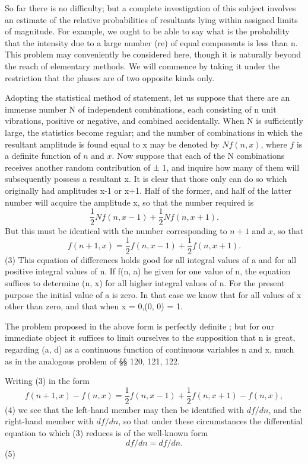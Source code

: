 So far there is no difficulty; but a complete investigation of this
subject involves an estimate of the relative probabilities of resultants
lying within assigned limits of magnitude. For example, we ought to be
able to say what is the probability that the intensity due to a large
number (re) of equal components is less than n. This problem may
conveniently be considered here, though it is naturally beyond the reach
of elementary methods. We will commence by taking it under the
restriction that the phases are of two opposite kinds only.

Adopting the statistical method of statement, let us suppose that there
are an immense number N of independent combinations, each consisting of
n unit vibrations, positive or negative, and combined accidentally. When
N is sufficiently large, the statistics become regular; and the number
of combinations in which the resultant amplitude is found equal to x may
be denoted by
\( N f(n, x)\), where
\(f\) is a definite function of
\(n\) and \(x\). Now suppose that each of the N
combinations receives another random contribution of ± 1, and inquire
how many of them will subsequently possess a resultant x. It is clear
that those only can do so which originally had amplitudes x-1 or x+1.
Half of the former, and half of the latter number will acquire the
amplitude x,
so that the number required is
\[ \frac{1}{2} Nf(n, x-1) + \frac{1}{2} Nf(n,x+1).\]
But this must be identical with the number corresponding to
\(n + 1\) and \(x\), so that
\[f(n+1, x)=\frac{1}{2} f(n,x-1) + \frac{1}{2} f(n,x+1).\]
(3) This equation of differences holds good for all integral values of a and
for all positive integral values of n. If f(n, a) he given for one value
of n, the equation suffices to determine (n, x) for all higher integral
values of n. For the present purpose the initial value of a is zero. In
that case we know that for
all values of x other than zero, and that when x = 0,(0, 0) = 1.

The problem proposed in the above form is perfectly definite ; but for
our immediate object it suffices to limit ourselves to the supposition
that n is great, regarding (a, d) as a continuous function of continuous
variables n and x, much as in the analogous problem of §§ 120, 121, 122.

Writing (3) in the form
\[f(n+1,x)-f(n,x)=\frac{1}{2} f(n,x-1) + \frac{1}{2} f(n,x+1) -f(n,x),\]
(4) we see that the left-hand member may then be identified with
\( df/dn\), and
the right-hand member with
\( df/dn\),
so that under
these circumstances the differential equation to which (3) reduces is of
the well-known form
\[ df/dn = df/dn.\]
(5)

